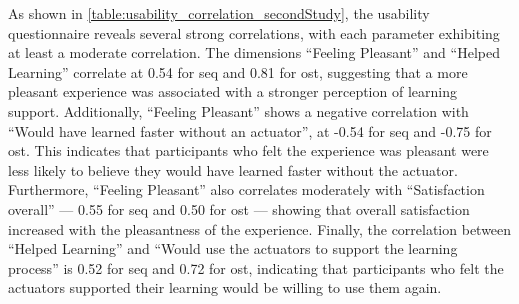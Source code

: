 As shown in \autoref{table:usability_correlation_secondStudy}, the usability questionnaire reveals several strong correlations, with each parameter exhibiting at least a moderate correlation.
The dimensions \enquote{Feeling Pleasant} and \enquote{Helped Learning} correlate at 0.54 for \gls{seq} and 0.81 for \gls{ost}, suggesting that a more pleasant experience was associated with a stronger perception of learning support.
Additionally, \enquote{Feeling Pleasant} shows a negative correlation with \enquote{Would have learned faster without an actuator}, at -0.54 for \gls{seq} and -0.75 for \gls{ost}. This indicates that participants who felt the experience was pleasant were less likely to believe they would have learned faster without the actuator.
Furthermore, \enquote{Feeling Pleasant} also correlates moderately with \enquote{Satisfaction overall} — 0.55 for \gls{seq} and 0.50 for \gls{ost} — showing that overall satisfaction increased with the pleasantness of the experience.
Finally, the correlation between \enquote{Helped Learning} and \enquote{Would use the actuators to support the learning process} is 0.52 for \gls{seq} and 0.72 for \gls{ost}, indicating that participants who felt the actuators supported their learning would be willing to use them again.

